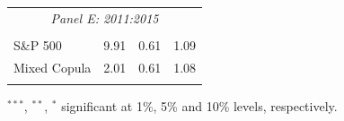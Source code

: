 \documentclass[pdf,10pt,xcolor=dvipsnames,hide notes]{beamer}
\begin{document}
\begin{frame}
\begin{threeparttable}[H]
\begin{tabularx}{\textwidth}{@{\extracolsep{\fill}}llll@{}}
		\multicolumn{4}{c}{\textit{Panel E: 2011:2015}} \\
		&       &       &       \\
		S\&P 500 & 9.91  & 0.61  & 1.09 \\
		Mixed Copula & 2.01  & 0.61  & 1.08 \\
		\multicolumn{1}{r}{} & \multicolumn{1}{r}{} & \multicolumn{1}{r}{} & \multicolumn{1}{r}{} \\
		\bottomrule
	\end{tabularx}%
	\begin{tablenotes}
		\item \scriptsize $^{\ast\ast\ast}$, $^{\ast\ast}$, $^{\ast}$  significant at 1\%, 5\% and 10\% levels, respectively.
	\end{tablenotes}
	\label{tab:table106}%
\end{threeparttable}%

\end{frame}
\end{document}
